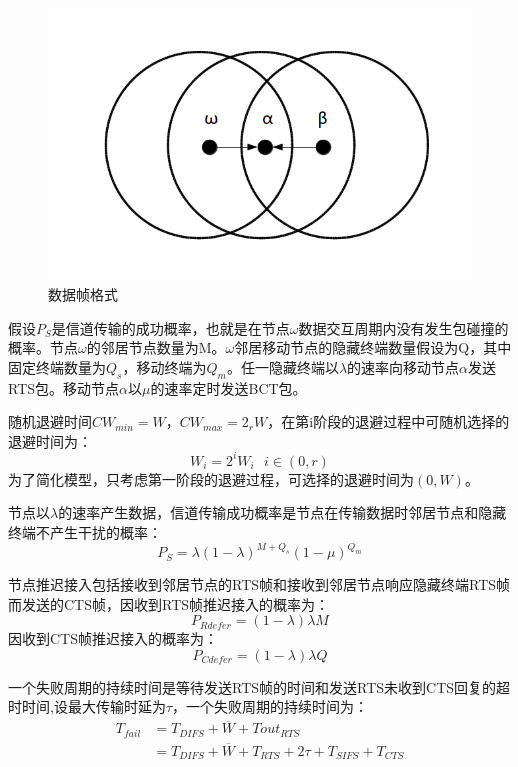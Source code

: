 \begin{figure}[!ht]
	\centering
	\includegraphics[scale=0.2]{figures/hidden.png}
	\caption{
		数据帧格式
	}
	\label{fig:example}
\end{figure}

假设$P_S$是信道传输的成功概率，也就是在节点$\omega$数据交互周期内没有发生包碰撞的概率。节点$\omega$的邻居节点数量为M。$\omega$邻居移动节点的隐藏终端数量假设为Q，其中固定终端数量为$Q_s$，移动终端为$Q_m$。任一隐藏终端以$\lambda$的速率向移动节点$\alpha$发送RTS包。移动节点$\alpha$以$\mu$的速率定时发送BCT包。

随机退避时间$CW_{min}=W$，$CW_{max}=2_r W$，在第i阶段的退避过程中可随机选择的退避时间为：
\begin{equation}
W_i=2^iW_i \ \ \ i\in(0,r)
\end{equation}
为了简化模型，只考虑第一阶段的退避过程，可选择的退避时间为$(0,W)$。

节点以$\lambda$的速率产生数据，信道传输成功概率是节点在传输数据时邻居节点和隐藏终端不产生干扰的概率：
\begin{equation}
P_S=\lambda(1-\lambda)^{M+Q_s}(1-\mu)^{Q_m}
\end{equation}

节点推迟接入包括接收到邻居节点的RTS帧和接收到邻居节点响应隐藏终端RTS帧而发送的CTS帧，因收到RTS帧推迟接入的概率为：
\begin{equation}
 P_{Rdefer}=(1-\lambda)\lambda M
\end{equation}
因收到CTS帧推迟接入的概率为：
\begin{equation}
 P_{Cdefer}=(1-\lambda)\lambda Q
\end{equation}

一个失败周期的持续时间是等待发送RTS帧的时间和发送RTS未收到CTS回复的超时时间,设最大传输时延为$\tau$，一个失败周期的持续时间为：
\begin{equation}
\begin{aligned}
T_{fail}&=T_{DIFS}+\overline W+Tout_{RTS}\\
&=T_{DIFS}+\overline W+T_{RTS}+2\tau+T_{SIFS}+T_{CTS}
\end{aligned}
\end{equation}

